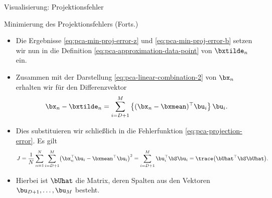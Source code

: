 \begin{frame}{Visualisierung: Projektionsfehler}{}

\end{frame}


\begin{frame}{Minimierung des Projektionsfehlers (Forts.)}{}
	\begin{itemize}
		\item Die Ergebnisse \eqref{eq:pca-min-proj-error-z} und \eqref{eq:pca-min-proj-error-b} setzen wir nun in
			die Definition \eqref{eq:pca-approximation-data-point} von $\bxtilde_n$ ein.
		\item Zusammen mit  der Darstellung \eqref{eq:pca-linear-combination-2} von $\bx_n$ erhalten wir für den Differenzvektor
		\begin{equation}
			\bx_n - \bxtilde_n = \sum_{i=D+1}^M \left\{ (\bx_n - \bxmean)^\top \bu_i \right\} \bu_i.
		\end{equation}
		\item Dies substituieren wir schließlich in die Fehlerfunktion \eqref{eq:pca-projection-error}. Es gilt
		\begin{equation} \label{eq:pca-projection-error-2}
			J
				= \frac{1}{N} \sum_{n=1}^N \sum_{i=D+1}^M \bigl( \bx_n^\top \bu_i - \bxmean^\top \bu_i \bigr)^2
				= \sum_{i=D+1}^M \bu_i^\top \bS \bu_i
				= \trace\bigl( \bUhat^\top \bS \bUhat \bigr).
		\end{equation}
		\item Hierbei ist $\bUhat$ die Matrix, deren Spalten aus den Vektoren $\bu_{D+1}, \ldots, \bu_M$ besteht.
	\end{itemize}
\end{frame}


